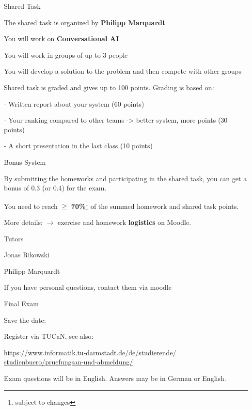 \documentclass[12pt]{beamer}
\let\todox\todo
\renewcommand\todo[1]{\todox[inline]{#1}}
\begin{document}
\begin{frame}{Shared Task}

The shared task is organized by \textbf{Philipp Marquardt}
	
You will work on \textbf{Conversational AI}

You will work in groups of up to 3 people

You will develop a solution to the problem and then compete with other groups

Shared task is graded and gives up to 100 points. Grading is based on:

- Written report about your system (60 points)

- Your ranking compared to other teams -> better system, more points (30 points)

- A short presentation in the last class (10 points)


	
\end{frame}

\begin{frame}{Bonus System}

By submitting the homeworks and participating in the shared task, you can get a bonus of 0.3 (or 0.4) for the exam.

You need to reach $\geq$ \textbf{70\%}\footnote{subject to changes} of the summed homework and shared task points.

More details: $\to$ exercise and homework \textbf{logistics} on Moodle.

\end{frame}

\begin{frame}{Tutors}
	
Jonas Rikowski

Philipp Marquardt
	

If you have personal questions, contact them via moodle 
	
\end{frame}

\begin{frame}{Final Exam}


Save the date:

\todo{To be announced on Moodle}

Register via TUCaN, see also:

\url{https://www.informatik.tu-darmstadt.de/de/studierende/
studienbuero/pruefungsan-und-abmeldung/}

Exam questions will be in English.
Answers may be in German or English.

\end{frame}
\end{document}
